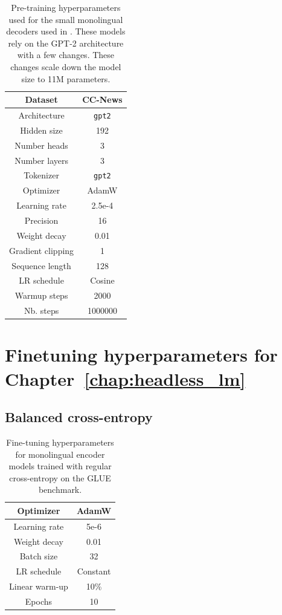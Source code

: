 \begin{appendices}
\begin{table}[H]
\centering
\small
\begin{tabular}{c|c}
\toprule
Dataset & CC-News \\ \hline
Architecture & \texttt{gpt2} \\ \hline
Hidden size & 192 \\ \hline
Number heads & 3 \\ \hline
Number layers & 3 \\ \hline
Tokenizer & \texttt{gpt2} \\ \hline
Optimizer         & AdamW      \\ \hline
Learning rate     & 2.5e-4       \\ \hline
Precision  & 16 \\ \hline
Weight decay      & 0.01       \\ \hline
Gradient clipping & 1          \\ \hline
Sequence length   & 128        \\ \hline
LR schedule       & Cosine \\ \hline
Warmup steps      & 2000      \\ \hline
Nb. steps         & 1000000        \\ \bottomrule
\end{tabular}
\caption{Pre-training hyperparameters used for the small monolingual decoders used in . These models rely on the GPT-2 architecture with a few changes. These changes scale down the model size to 11M parameters.}
\end{table}

\section{Finetuning hyperparameters for Chapter~\ref{chap:headless_lm}}
\label{app:ft}

\subsection{Balanced cross-entropy}
\label{app:bce}


\begin{table}[h]
\centering \small
\begin{tabular}{c|c}
\toprule
Optimizer        &   AdamW         \\ \hline
Learning rate        &   5e-6         \\ \hline
Weight decay  &     0.01      \\ \hline
Batch size & 32 \\ \hline
LR schedule & Constant \\ \hline
Linear warm-up & 10\% \\ \hline
Epochs & 10 \\ \bottomrule
\end{tabular}
\caption{Fine-tuning hyperparameters for monolingual encoder models trained with regular cross-entropy on the GLUE benchmark.}
\label{tab:hp_unbalanced}
\end{table}




\end{appendices}
